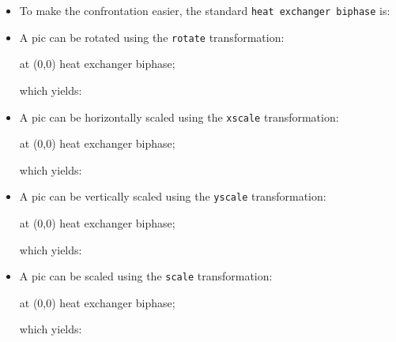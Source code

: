 \documentclass[12pt]{article}						%
\newcommand*{\chpp}[1]{\texttt{#1}}				%
\begin{document}
\begin{itemize}
	\item To make the confrontation easier, the standard
		\chpp{heat exchanger biphase} is:
		\begin{center}
		\end{center}
	\item A pic can be rotated using the \verb|rotate| transformation:
		\begin{chpcode}[gobble=12]
			\pic[rotate=90] at (0,0) {heat exchanger biphase};
		\end{chpcode}
		which yields:
		\begin{center}
		\end{center}
	\item A pic can be horizontally scaled using the \verb|xscale|
		transformation:
		\begin{chpcode}[gobble=12]
			\pic[xscale=1.5] at (0,0) {heat exchanger biphase};
		\end{chpcode}
		which yields:
		\begin{center}
		\end{center}
	\item A pic can be vertically scaled using the \verb|yscale|
		transformation:
		\begin{chpcode}[gobble=12]
			\pic[yscale=1.5] at (0,0) {heat exchanger biphase};
		\end{chpcode}
		which yields:
		\begin{center}
		\end{center}
	\item A pic can be scaled using the \verb|scale| transformation:
		\begin{chpcode}[gobble=12]
			\pic[scale=1.5] at (0,0) {heat exchanger biphase};
		\end{chpcode}
		which yields:
		\begin{center}
		\end{center}
\end{itemize}
\end{document}
